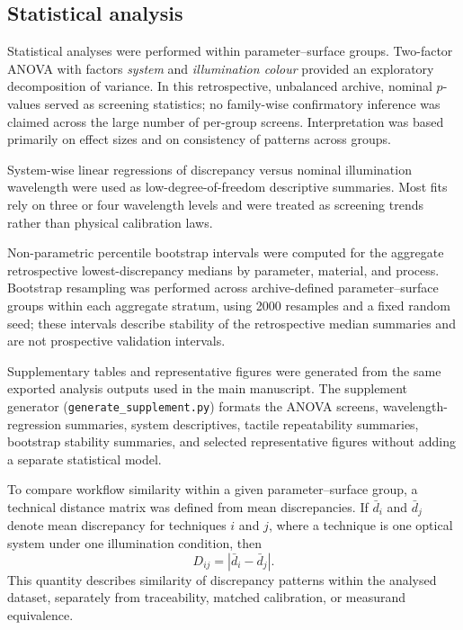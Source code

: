 \documentclass{article}
\begin{document}
\subsection{Statistical analysis}
Statistical analyses were performed within parameter--surface groups. Two-factor ANOVA with factors \emph{system} and \emph{illumination colour} provided an exploratory decomposition of variance. In this retrospective, unbalanced archive, nominal $p$-values served as screening statistics; no family-wise confirmatory inference was claimed across the large number of per-group screens. Interpretation was based primarily on effect sizes and on consistency of patterns across groups.

System-wise linear regressions of discrepancy versus nominal illumination wavelength were used as low-degree-of-freedom descriptive summaries. Most fits rely on three or four wavelength levels and were treated as screening trends rather than physical calibration laws.

Non-parametric percentile bootstrap intervals were computed for the aggregate retrospective lowest-discrepancy medians by parameter, material, and process. Bootstrap resampling was performed across archive-defined parameter--surface groups within each aggregate stratum, using 2000 resamples and a fixed random seed; these intervals describe stability of the retrospective median summaries and are not prospective validation intervals.

Supplementary tables and representative figures were generated from the same exported analysis outputs used in the main manuscript. The supplement generator (\texttt{generate\_supplement.py}) formats the ANOVA screens, wavelength-regression summaries, system descriptives, tactile repeatability summaries, bootstrap stability summaries, and selected representative figures without adding a separate statistical model.

To compare workflow similarity within a given parameter--surface group, a technical distance matrix was defined from mean discrepancies. If $\bar d_i$ and $\bar d_j$ denote mean discrepancy for techniques $i$ and $j$, where a technique is one optical system under one illumination condition, then
\begin{equation}
D_{ij}=|\bar d_i-\bar d_j|.
\label{eq:distance}
\end{equation}
This quantity describes similarity of discrepancy patterns within the analysed dataset, separately from traceability, matched calibration, or measurand equivalence.
\end{document}
